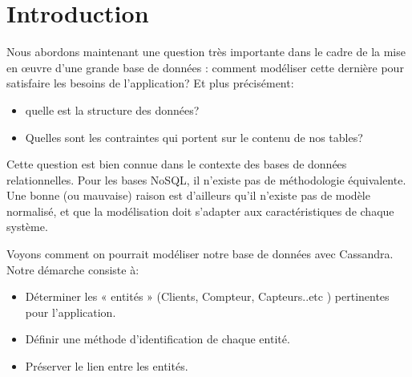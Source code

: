 \section*{Introduction}
Nous abordons maintenant une question très importante dans le cadre de la mise en œuvre d’une grande base de données : comment modéliser cette dernière pour satisfaire les besoins de l’application? Et plus précisément:

\begin{itemize}[label=\textbullet]
\item quelle est la structure des données?
\item Quelles sont les contraintes qui portent sur le contenu de nos tables? 
\end{itemize}

Cette question est bien connue dans le contexte des bases de données relationnelles. Pour les bases NoSQL, il n’existe pas de méthodologie équivalente. Une bonne (ou mauvaise) raison est d’ailleurs qu’il n’existe pas de modèle normalisé, et que la modélisation doit s’adapter aux caractéristiques de chaque système.

Voyons comment on pourrait modéliser notre base de données avec Cassandra. Notre démarche consiste à:
\begin{itemize}[label=\textbullet]
\item Déterminer les « entités » (Clients, Compteur, Capteurs..etc ) pertinentes pour l’application.
\item Définir une méthode d'identification de chaque entité.
\item Préserver le lien entre les entités.
\end{itemize}

